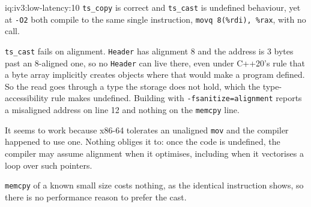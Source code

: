 \begin{solution}{iq:iv3:low-latency:10}
\texttt{ts\_copy} is correct and \texttt{ts\_cast} is undefined behaviour, yet at \texttt{-O2} both compile to the same single instruction, \texttt{movq 8(\%rdi), \%rax}, with no call.

\texttt{ts\_cast} fails on alignment. \texttt{Header} has alignment 8 and the address is 3 bytes past an 8-aligned one, so no \texttt{Header} can live there, even under C++20's rule that a byte array implicitly creates objects where that would make a program defined. So the read goes through a type the storage does not hold, which the type-accessibility rule makes undefined. Building with \texttt{-fsanitize=alignment} reports a misaligned address on line 12 and nothing on the \texttt{memcpy} line.

It seems to work because x86-64 tolerates an unaligned \texttt{mov} and the compiler happened to use one. Nothing obliges it to: once the code is undefined, the compiler may assume alignment when it optimises, including when it vectorises a loop over such pointers.

\texttt{memcpy} of a known small size costs nothing, as the identical instruction shows, so there is no performance reason to prefer the cast.

\end{solution}

